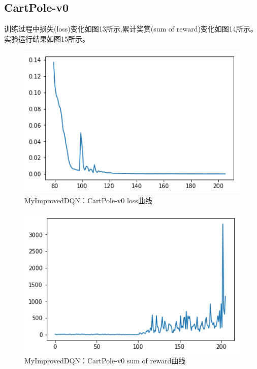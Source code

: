 \documentclass[a4paper,UTF8]{article}
\theoremstyle{definition}
\begin{document}
    \subsection{CartPole-v0}
    训练过程中损失(loss)变化如图13所示,累计奖赏(sum of reward)变化如图14所示。实验运行结果如图15所示。
    \begin{center}
    \begin{figure}[H]
          \centering
          \includegraphics[width=12cm]{29.png}
          \caption{MyImprovedDQN：CartPole-v0 loss曲线}
          \label{fig:2.3}
    \end{figure}
    \end{center}
    \begin{center}
    \begin{figure}[H]
          \centering
          \includegraphics[width=12cm]{30.png}
          \caption{MyImprovedDQN：CartPole-v0 sum of reward曲线}
          \label{fig:2.3}
    \end{figure}
    \end{center}
\end{document}

